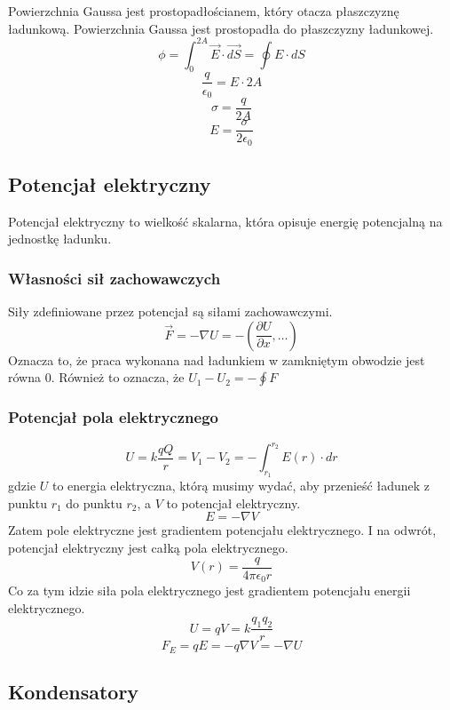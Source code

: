 \documentclass{../notatki}
\begin{document}
Powierzchnia Gaussa jest prostopadłościanem, który otacza płaszczyznę
ładunkową. Powierzchnia Gaussa jest prostopadła do płaszczyzny ładunkowej.
$$
\phi = \int_{0}^{2A} \vec{E} \cdot \vec{dS} = \oint E \cdot dS
$$
$$
\frac{q}{\epsilon_0} = E \cdot 2A
$$
$$
\sigma = \frac{q}{2A}
$$
$$
E = \frac{\sigma}{2\epsilon_0}
$$

\subsection{Potencjał elektryczny}

Potencjał elektryczny to wielkość skalarna, która opisuje energię
potencjalną na jednostkę ładunku.

\subsubsection{Własności sił zachowawczych}

Siły zdefiniowane przez potencjał są siłami zachowawczymi.
$$
\vec{F} = - \nabla U = - (\frac{\partial U}{\partial x}, \dots)
$$
Oznacza to, że praca wykonana nad ładunkiem w zamkniętym obwodzie jest równa 0.
Również to oznacza, że $U_1 - U_2 = - \oint F$

\subsubsection{Potencjał pola elektrycznego}

$$
U = k\frac{qQ}{r} = V_1 - V_2 = - \int_{r_1}^{r_2} E(r) \cdot dr
$$
gdzie $U$ to energia elektryczna, którą musimy wydać, aby przenieść ładunek z
punktu $r_1$ do punktu $r_2$, a $V$ to potencjał elektryczny.
$$
E = - \nabla V
$$
Zatem pole elektryczne jest gradientem potencjału elektrycznego. I na odwrót,
potencjał elektryczny jest całką pola elektrycznego.
$$
V(r) = \frac{q}{4\pi\epsilon_0 r}
$$
Co za tym idzie siła pola elektrycznego jest gradientem potencjału
energii elektrycznego.
$$
U = qV = k \frac{q_1 q_2}{r}
$$
$$
F_E = qE = -q \nabla V = - \nabla U
$$

\subsection{Kondensatory}
\end{document}

